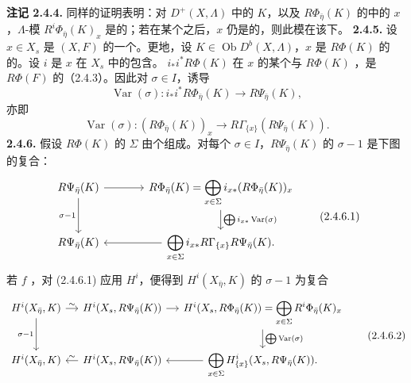 \textbf{注记 2.4.4.} 同样的证明表明：对 $D^+(X,\Lambda)$ 中的 $K$，以及 $R\Phi_{\bar\eta}(K)$ 的中的 $x$，$\Lambda$-模 $R^i\Phi_{\bar\eta}(K)_x$ 是的；若在某个之后，$x$ 仍是的，则此模在该下。
\textbf{2.4.5.} 设 $x\in X_s$ 是 $(X,F)$ 的一个。更地，设 $K\in\operatorname{Ob}D^b(X,\Lambda)$，$x$ 是 $R\Phi(K)$ 的的。设 $i$ 是 $x$ 在 $X_s$ 中的包含。 $i_*i^*R\Phi(K)$ 在 $x$ 的某个与 $R\Phi(K)$ ，是 $R\Phi(F)$ 的（2.4.3）。因此对 $\sigma\in I$，诱导
\[\operatorname{Var}(\sigma):i_*i^*R\Phi_{\bar\eta}(K)\longrightarrow R\Psi_{\bar\eta}(K),\]
亦即
\[\operatorname{Var}(\sigma):(R\Phi_{\bar\eta}(K))_x\longrightarrow R\Gamma_{\{x\}}(R\Psi_{\bar\eta}(K)).\tag{2.4.5.1}\]
\textbf{2.4.6.} 假设 $R\Phi(K)$ 的 $\Sigma$ 由个组成。对每个 $\sigma\in I$，$R\Psi_{\bar\eta}(K)$ 的 $\sigma-1$ 是下图的复合：
\[
\begin{tikzcd}[column sep=large]
R\Psi_{\bar\eta}(K)\arrow[r]\arrow[d,"\sigma-1"']&R\Phi_{\bar\eta}(K)=\displaystyle\bigoplus_{x\in\Sigma}i_{x*}(R\Phi_{\bar\eta}(K))_x\arrow[d,"{\bigoplus i_{x*}\operatorname{Var}(\sigma)}"]\\
R\Psi_{\bar\eta}(K)&\displaystyle\bigoplus_{x\in\Sigma}i_{x*}R\Gamma_{\{x\}}R\Psi_{\bar\eta}(K)\arrow[l].
\end{tikzcd}\tag{2.4.6.1}
\]
若 $f$ ，对 (2.4.6.1) 应用 $H^i$，便得到 $H^i(X_{\bar\eta},K)$ 的 $\sigma-1$ 为复合
\[
\begin{tikzcd}[column sep=small]
H^i(X_{\bar\eta},K)\arrow[r,"\sim"]\arrow[d,"\sigma-1"']&H^i(X_s,R\Psi_{\bar\eta}(K))\arrow[r]&H^i(X_s,R\Phi_{\bar\eta}(K))=\displaystyle\bigoplus_{x\in\Sigma}R^i\Phi_{\bar\eta}(K)_x\arrow[d,"{\bigoplus\operatorname{Var}(\sigma)}"]\\
H^i(X_{\bar\eta},K)&H^i(X_s,R\Psi_{\bar\eta}(K))\arrow[l,"\sim"']&\displaystyle\bigoplus_{x\in\Sigma}H^i_{\{x\}}(X_s,R\Psi_{\bar\eta}(K))\arrow[l].
\end{tikzcd}\tag{2.4.6.2}
\]
